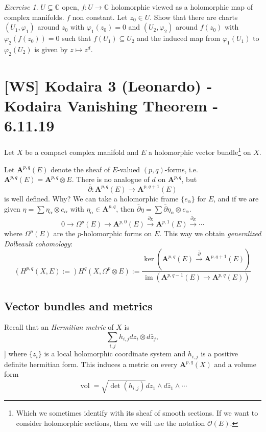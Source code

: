 \documentclass[12pt]{article}
\theoremstyle{darkgreentheorem}
\theoremstyle{darkbluedefinition}
\theoremstyle{darkredexample}
\theoremstyle{remark}
\newtheorem{exe}[thm]{Exercise}
\newcommand{\1}{\mathbbm{1}}
\newcommand{\C}{\mathbb{C}}
\newcommand{\A}{\mathbf{A}}
\renewcommand{\O}{\mathcal{O}}
\DeclareMathOperator{\im}{im}
\DeclareMathOperator{\vol}{vol}
\newcommand{\ot}{\otimes}
\newcommand{\sub}{\subseteq}
\begin{document}
\begin{exe}
    $U\sub\C$ open, $f\colon U\to \C$ holomorphic viewed as a holomorphic map of complex manifolds.
    $f$ non constant.
    Let $z_{0}\in U$.
    Show that there are charts $(U_{1},\varphi_{1})$ around $z_{0}$ with $\varphi_{1}(z_{0})=0$ and $(U_{2},\varphi_{2})$ around $f(z_{0})$ with $\varphi_{2}(f(z_{0}))=0$ such that $f(U_{1})\sub U_{2}$ and the induced map from $\varphi_{1}(U_{1})$ to $\varphi_{2}(U_{2})$ is given by $z\mapsto z^{d}$.
\end{exe}

\section{[WS] Kodaira 3 (Leonardo) - Kodaira Vanishing Theorem - 6.11.19}

Let $X$ be a compact complex manifold and $E$ a holomorphic vector bundle\footnote{Which we sometimes identify with its sheaf of smooth sections. If we want to consider holomorphic sections, then we will use the notation $\O(E)$.} on $X$.

Let $\A^{p,q}(E)$ denote the sheaf of $E$-valued $(p,q)$-forms, i.e. $\A^{p,q}(E)=\A^{p,q}\ot E$.
There is no analogue of $d$ on $\A^{p,q}$, but
\[ \bar{\partial }\colon \A^{p,q}(E)\to \A^{p,q+1}(E) \]
is well defined.
Why?
We can take a holomorphic frame $\{ e_{\alpha}\}$ for $E$, and if we are given $\eta=\sum \eta_{\alpha}\ot e_{\alpha}$ with $\eta_{\alpha}\in \A^{p,q}$, then $\bar{\partial }\eta=\sum\bar{\partial}\eta_{\alpha}\ot e_{\alpha}$.
\[ 0\to \Omega^{p}(E)\to \A^{p,0}(E)\xrightarrow{\bar{\partial}_{E}} \A^{p,1}(E)\xrightarrow{\bar{\partial}_{E}}\cdots \]
where $\Omega^{p}(E)$ are the $p$-holomorphic forms on $E$.
This way we obtain \textit{generalized Dolbeault cohomology}:
\[ (H^{p,q}(X,E):=)H^{q}(X,\Omega^{p}\ot E):=\frac{\ker(\A^{p,q}(E)\xrightarrow{\bar{\partial}}\A^{p,q+1}(E))}{\im(\A^{p,q-1}(E)\to \A^{p,q}(E))} \]

\subsection{Vector bundles and metrics}

Recall that an \textit{Hermitian metric} of $X$ is
\[ \sum_{i,j}h_{i,j}dz_{i}\ot d\bar{z}_{j},\]]
where $\{z_{i}\}$ is a local holomorphic coordinate system and $h_{i,j}$ is a positive definite hermitian form.
This induces a metric on every $\A^{p,q}(X)$ and a volume form
\[ \vol=\sqrt{\det(h_{i,j})}dz_{1}\wedge d\bar{z}_{1}\wedge \cdots \]
\end{document}
